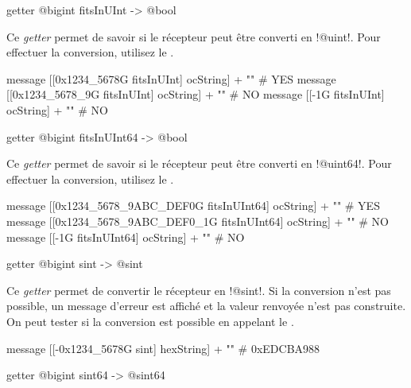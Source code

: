 
\begin{galgasbox}
getter @bigint fitsInUInt -> @bool
\end{galgasbox}

Ce \emph{getter} permet de savoir si le récepteur peut être converti en \ggs!@uint!. Pour effectuer la conversion, utilisez le .

\begin{galgas}
message [[0x1234_5678G fitsInUInt] ocString] + "\n" # YES
message [[0x1234_5678_9G fitsInUInt] ocString] + "\n" # NO
message [[-1G fitsInUInt] ocString] + "\n" # NO
\end{galgas}







\begin{galgasbox}
getter @bigint fitsInUInt64 -> @bool
\end{galgasbox}

Ce \emph{getter} permet de savoir si le récepteur peut être converti en \ggs!@uint64!. Pour effectuer la conversion, utilisez le .

\begin{galgas}
message [[0x1234_5678_9ABC_DEF0G fitsInUInt64] ocString] + "\n" # YES
message [[0x1234_5678_9ABC_DEF0_1G fitsInUInt64] ocString] + "\n" # NO
message [[-1G fitsInUInt64] ocString] + "\n" # NO
\end{galgas}



\begin{galgasbox}
getter @bigint sint -> @sint
\end{galgasbox}

Ce \emph{getter} permet de convertir le récepteur en \ggs!@sint!. Si la conversion n'est pas possible, un message d'erreur est affiché et la valeur renvoyée n'est pas construite. On peut tester si la conversion est possible en appelant le .

\begin{galgas}
message [[-0x1234_5678G sint] hexString] + "\n" # 0xEDCBA988
\end{galgas}





\begin{galgasbox}
getter @bigint sint64 -> @sint64
\end{galgasbox}

